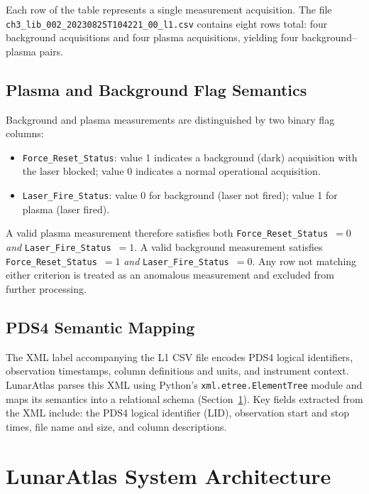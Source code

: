 \documentclass[a4paper,twocolumn,10pt]{article}
\begin{document}
Each row of the table represents a single measurement acquisition.
The file \texttt{ch3\_lib\_002\_20230825T104221\_00\_l1.csv} contains
eight rows total: four background acquisitions and four plasma
acquisitions, yielding four background--plasma pairs.

\subsection{Plasma and Background Flag Semantics}

Background and plasma measurements are distinguished by two binary
flag columns:
\begin{itemize}[nosep,leftmargin=*]
  \item \texttt{Force\_Reset\_Status}: value 1 indicates a background
    (dark) acquisition with the laser blocked; value 0 indicates a
    normal operational acquisition.
  \item \texttt{Laser\_Fire\_Status}: value 0 for background (laser not
    fired); value 1 for plasma (laser fired).
\end{itemize}

A valid plasma measurement therefore satisfies both
\texttt{Force\_Reset\_Status}~$=0$ \emph{and}
\texttt{Laser\_Fire\_Status}~$=1$.  A valid background measurement
satisfies \texttt{Force\_Reset\_Status}~$=1$ \emph{and}
\texttt{Laser\_Fire\_Status}~$=0$.  Any row not matching either
criterion is treated as an anomalous measurement and excluded from
further processing.

\subsection{PDS4 Semantic Mapping}

The XML label accompanying the L1 CSV file encodes PDS4 logical
identifiers, observation timestamps, column definitions and units, and
instrument context.  LunarAtlas parses this XML using Python's
\texttt{xml.etree.ElementTree} module and maps its semantics into a
relational schema (Section~\ref{sec:architecture}).  Key fields
extracted from the XML include: the PDS4 logical identifier (LID),
observation start and stop times, file name and size, and column
descriptions.


\section{LunarAtlas System Architecture}
\label{sec:architecture}
\end{document}
